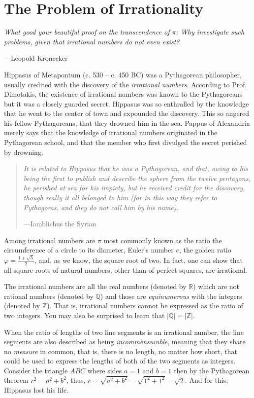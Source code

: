 \section{The Problem of Irrationality}
\epigraph{\emph{What good your beautiful proof on the transcendence of $\pi$: Why investigate such problems, given that irrational numbers do not even exist?}}{---Leopold Kronecker}


\noindent
Hippasus of Metapontum (c.\xspace 530 -- c.\xspace 450 BC) was a
Pythagorean philosopher, usually credited with the discovery of the
\emph{irrational numbers}. According to Prof.\xspace Dimotakis, the
existence of irrational numbers was known to the Pythagoreans but
it was a closely guarded secret. Hippasus was so enthralled by the
knowledge that he went to the center of town and expounded the
discovery.  This so angered his fellow Pythagoreans, that they
drowned him in the sea.  Pappus of Alexandria merely says that the
knowledge of irrational numbers originated in the Pythagorean school,
and that the member who first divulged the secret perished by
drowning.

\begin{quote}
\emph{It is related to Hippasus that he was a Pythagorean, and that,
owing to his being the first to publish and describe the sphere
from the twelve pentagons, he perished at sea for his impiety, but
he received credit for the discovery, though really it all belonged
to \emph{him} (for in this way they refer to Pythagoras, and they
do not call him by his name).}

        \hfill{---Iamblichus the Syrian}
\end{quote}

Among irrational numbers are $\pi$ most commonly known as the ratio the
circumference of a circle to its diameter, Euler's number $e$, the
golden ratio $\varphi=\tfrac{1+\sqrt{5}}{2}$, and, as we know, the
square root of two. In fact, one can show that all square roots of
natural numbers, other than of perfect squares, are irrational.

The irrational numbers are all the real numbers (denoted by
$\mathbb{R}$) which are not rational numbers (denoted by $\mathbb{Q}$)
and those are \emph{equinumerous} with the integers (denoted by
$\mathbb{Z}$). That is, irrational numbers cannot be expressed as the
ratio of two integers. You may also be surprised to learn that
$|\mathbb{Q}| = |\mathbb{Z}|$.

When the ratio of lengths of two line segments is an irrational number,
the line segments are also described as being \emph{incommensurable},
meaning that they share no \emph{measure} in common, that is, there is
no length, no matter how short, that could be used to express the
lengths of both of the two segments as integers. Consider the triangle
$ABC$ where sides $a=1$ and $b=1$ then by the Pythagorean theorem $c^2 =
a^2 + b^2$, thus, $c = \sqrt{a^2+b^2} = \sqrt{1^2+1^2} = \sqrt{2}$. And
for this, Hippasus lost his life.

